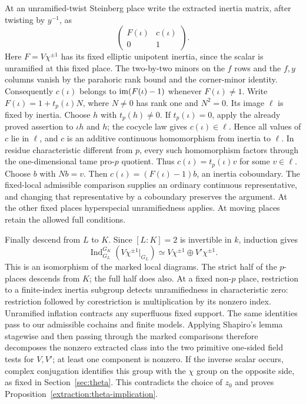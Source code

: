 At an unramified-twist Steinberg place write the extracted
inertia matrix, after twisting by $y^{-1}$, as
\[
           \begin{pmatrix}F(\iota)&c(\iota)\\0&1\end{pmatrix}.
\]
Here $F=V\chi^{\pm1}$ has its fixed elliptic unipotent
inertia, since the scalar is unramified at this fixed place.
The two-by-two minors on the $f$ rows and the $f,y$ columns
vanish by the parahoric rank bound and the corner-minor
identity.  Consequently $c(\iota)$ belongs to
$\operatorname{im}(F(\iota)-1)$ whenever $F(\iota)\ne1$.
Write $F(\iota)=1+t_p(\iota)N$, where $N\ne0$ has rank
one and $N^2=0$.  Its image $\ell$ is fixed by inertia.
Choose $h$ with $t_p(h)\ne0$.  If $t_p(\iota)=0$, apply
the already proved assertion to $\iota h$ and $h$;
the cocycle law gives $c(\iota)\in\ell$.  Hence all values
of $c$ lie in $\ell$, and $c$ is an additive continuous
homomorphism from inertia to $\ell$.  In residue
characteristic different from $p$, every such homomorphism
factors through the one-dimensional tame pro-$p$ quotient.
Thus $c(\iota)=t_p(\iota)v$ for some $v\in\ell$.
Choose $b$ with $Nb=v$.  Then
$c(\iota)=(F(\iota)-1)b$, an inertia coboundary.
The fixed-local admissible comparison supplies an ordinary
continuous representative, and changing that representative
by a coboundary preserves the argument.  At the other fixed
places hyperspecial unramifiedness applies.  At moving
places retain the allowed full conditions.

Finally descend from $L$ to $K$.  Since $[L:K]=2$ is
invertible in $k$, induction gives
\[
 \operatorname{Ind}_{G_L}^{G_K}(V\chi^{\pm1}|_{G_L})
       \simeq V\chi^{\pm1}\oplus V'\chi^{\pm1}.
\]
This is an isomorphism of the marked local diagrams.  The
strict half of the $p$-places descends from $K$; the full
half does also.  At a fixed non-$p$ place, restriction to
a finite-index inertia subgroup detects unramifiedness in
characteristic zero: restriction followed by corestriction
is multiplication by its nonzero index.  Unramified
inflation contracts any superfluous fixed support.
The same identities pass to our admissible cochains and
finite models.  Applying Shapiro's lemma stagewise and then
passing through the marked comparisons therefore decomposes the
nonzero extracted class into the two primitive one-sided
field tests for $V,V'$; at least one component is nonzero.
If the inverse scalar occurs, complex conjugation identifies
this group with the $\chi$ group on the opposite side, as
fixed in Section~\ref{sec:theta}.  This contradicts the
choice of $z_0$ and proves
Proposition~\ref{extraction:theta-implication}.
